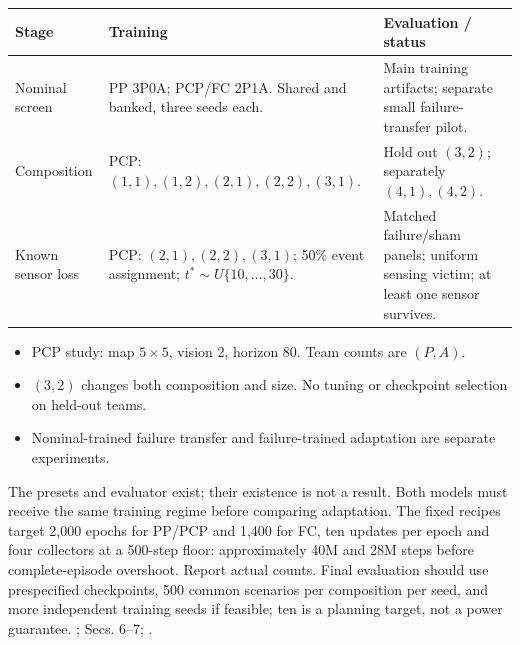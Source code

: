 {\small
\begin{tabular}{>{\raggedright\arraybackslash}p{.19\linewidth}>{\raggedright\arraybackslash}p{.38\linewidth}>{\raggedright\arraybackslash}p{.34\linewidth}}
\toprule
Stage & Training & Evaluation / status\\\midrule
Nominal screen & PP 3P0A; PCP/FC 2P1A. Shared and banked, three seeds each. & Main training artifacts; separate small failure-transfer pilot.\\[2mm]
Composition & PCP: $(1,1),(1,2),(2,1),(2,2),(3,1)$. & Hold out $(3,2)$; separately $(4,1),(4,2)$.\\[2mm]
Known sensor loss & PCP: $(2,1),(2,2),(3,1)$; 50\% event assignment; $t^*\sim U\{10,\ldots,30\}$. & Matched failure/sham panels; uniform sensing victim; at least one sensor survives.\\
\bottomrule
\end{tabular}
\medskip
\begin{itemize}
\item PCP study: map $5\times5$, vision 2, horizon 80. Team counts are $(P,A)$.
\item $(3,2)$ changes both composition and size. No tuning or checkpoint selection on held-out teams.
\item Nominal-trained failure transfer and failure-trained adaptation are separate experiments.
\end{itemize}}
{The presets and evaluator exist; their existence is not a result. Both models must receive the same training regime before comparing adaptation. The fixed recipes target 2,000 epochs for PP/PCP and 1,400 for FC, ten updates per epoch and four collectors at a 500-step floor: approximately 40M and 28M steps before complete-episode overshoot. Report actual counts. Final evaluation should use prespecified checkpoints, 500 common scenarios per composition per seed, and more independent training seeds if feasible; ten is a planning target, not a power guarantee.}
{;  Secs. 6--7; .}

